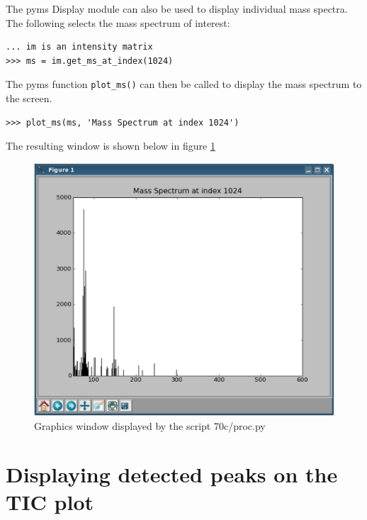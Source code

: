 The pyms Display module can also be used to display individual mass spectra. The 
following selects the mass spectrum of interest:

\begin{verbatim}
... im is an intensity matrix
>>> ms = im.get_ms_at_index(1024)
\end{verbatim}

The pyms function {\tt plot\_ms()} can then be called to display the mass spectrum to 
the screen.

\begin{verbatim}
>>> plot_ms(ms, 'Mass Spectrum at index 1024')
\end{verbatim}

The resulting window is shown below in figure \ref{fig:70c}

\begin{figure}
  \begin{center}
    \includegraphics[scale=0.33]{graphics/chapter07/test-70c.eps}
  \end{center}
  \caption{Graphics window displayed by the script 70c/proc.py}
  \label{fig:70c}
\end{figure}

\section{Displaying detected peaks on the TIC plot}


